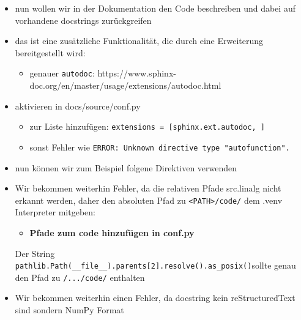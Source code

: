 \begin{itemize}
\tightlist
\item
  nun wollen wir in der Dokumentation den Code beschreiben und dabei auf
  vorhandene docstrings zurückgreifen
\item
  das ist eine zusätzliche Funktionalität, die durch eine Erweiterung
  bereitgestellt wird:

  \begin{itemize}
  \tightlist
  \item
    genauer \texttt{autodoc}:
    https://www.sphinx-doc.org/en/master/usage/extensions/autodoc.html
  \end{itemize}
\item
  aktivieren in docs/source/conf.py

  \begin{itemize}
  \tightlist
  \item
    zur Liste hinzufügen:
    \texttt{extensions\ =\ {[}\textquotesingle{}sphinx.ext.autodoc\textquotesingle{},\ {]}}
  \item
    sonst Fehler wie
    \texttt{ERROR:\ Unknown\ directive\ type\ "autofunction".}
  \end{itemize}
\item
  nun können wir zum Beispiel folgene Direktiven verwenden
\end{itemize}

\begin{Shaded}
\begin{Highlighting}[]

\end{Highlighting}
\end{Shaded}

\begin{itemize}
\item
  Wir bekommen weiterhin Fehler, da die relativen Pfade src.linalg nicht
  erkannt werden, daher den absoluten Pfad zu
  \texttt{\textless{}PATH\textgreater{}/code/} dem .venv Interpreter
  mitgeben:

  \begin{itemize}
  \tightlist
  \item
    \textbf{Pfade zum code hinzufügen in conf.py}
  \end{itemize}

\begin{Shaded}
\begin{Highlighting}[]
\NormalTok{).parents[}\NormalTok{].resolve().as_posix())}
\end{Highlighting}
\end{Shaded}

  Der String
  \texttt{pathlib.Path(\_\_file\_\_).parents{[}2{]}.resolve().as\_posix()}sollte
  genau den Pfad zu \texttt{/.../code/} enthalten
\item
  Wir bekommen weiterhin einen Fehler, da docstring kein
  reStructuredText sind sondern NumPy Format
\end{itemize}

